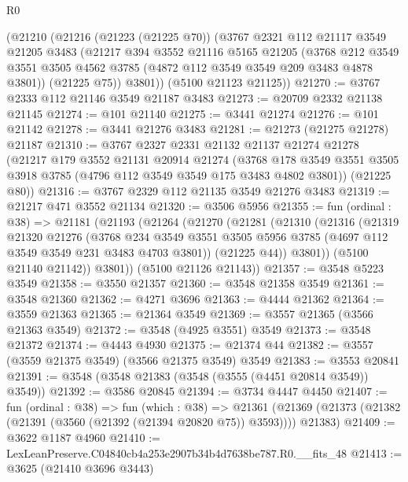 \begin{lexlean}{R0}
\begin{coremodule}
    (@21210
      (@21216
        (@21223 (@21225 @70))
        (@3767
          @2321
          @112
          @21117
          @3549
          @21205
          @3483
          (@21217
            @394
            @3552
            @21116
            @5165
            @21205
            (@3768
              @212
              @3549
              @3551
              @3505
              @4562
              @3785
              (@4872 @112 @3549 @3549 @209 @3483 @4878 @3801))
            (@21225 @75))
          @3801))
      (@5100 @21123 @21125))
@21270 := @3767 @2333 @112 @21146 @3549 @21187 @3483
@21273 := @20709 @2332 @21138 @21145
@21274 := @101 @21140
@21275 := @3441 @21274
@21276 := @101 @21142
@21278 := @3441 @21276 @3483
@21281 := @21273 (@21275 @21278) @21187
@21310 := @3767
    @2327
    @2331
    @21132
    @21137
    @21274
    @21278
    (@21217
      @179
      @3552
      @21131
      @20914
      @21274
      (@3768 @178 @3549 @3551 @3505 @3918 @3785 (@4796 @112 @3549 @3549 @175 @3483 @4802 @3801))
      (@21225 @80))
@21316 := @3767 @2329 @112 @21135 @3549 @21276 @3483
@21319 := @21217 @471 @3552 @21134
@21320 := @3506 @5956
@21355 := fun (ordinal : @38) =>
  @21181
    (@21193
      (@21264
        (@21270
          (@21281
            (@21310
              (@21316
                (@21319
                  @21320
                  @21276
                  (@3768
                    @234
                    @3549
                    @3551
                    @3505
                    @5956
                    @3785
                    (@4697 @112 @3549 @3549 @231 @3483 @4703 @3801))
                  (@21225 @44))
                @3801))
            (@5100 @21140 @21142))
          @3801))
      (@5100 @21126 @21143))
@21357 := @3548 @5223 @3549
@21358 := @3550 @21357
@21360 := @3548 @21358 @3549
@21361 := @3548 @21360
@21362 := @4271 @3696
@21363 := @4444 @21362
@21364 := @3559 @21363
@21365 := @21364 @3549
@21369 := @3557 @21365 (@3566 @21363 @3549)
@21372 := @3548 (@4925 @3551) @3549
@21373 := @3548 @21372
@21374 := @4443 @4930
@21375 := @21374 @44
@21382 := @3557 (@3559 @21375 @3549) (@3566 @21375 @3549) @3549
@21383 := @3553 @20841
@21391 := @3548 (@3548 @21383 (@3548 (@3555 (@4451 @20814 @3549)) @3549))
@21392 := @3586 @20845
@21394 := @3734 @4447 @4450
@21407 := fun (ordinal : @38) =>
  fun (which : @38) =>
  @21361 (@21369 (@21373 (@21382 (@21391 (@3560 (@21392 (@21394 @20820 @75)) @3593)))) @21383)
@21409 := @3622 @1187 @4960
@21410 := LexLeanPreserve.C04840cb4a253e2907b34b4d7638be787.R0.__fits_48
@21413 := @3625 (@21410 @3696 @3443)

\end{coremodule}
\end{lexlean}
